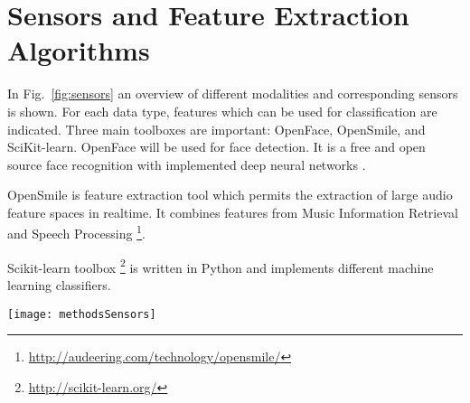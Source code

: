 \begin{comment}
\textbf{Project Oxford:} by Microsoft provides APIs for categories such as Vision, Speech, Language, Knowledge and Search. Can be tested for free.
\url{https://azure.microsoft.com/en-us/try/cognitive-services/}\\

\textbf{FaceReader:} by Noldus is widely used for academic purposes. It is a facial expression analysis software for analyzing universal emotions in addition to neutral and contempt. The software is also used to observe gaze direction and head orientation. Used more than 10,000 annotated images for training. Describes the face with 500 key points. Can be rented. 
\url{http://www.noldus.com/human-behavior-research/products/facereader}\\

\textbf{InSight} by Sightcorp is a facial expression analysis API and is also used for eye tracking, age and gender estimation, head pose estimation, etc. 2 weeks free trial.
\url{http://sightcorp.com/insight/}\\
\end{comment}




\section{Sensors and Feature Extraction Algorithms}
\label{sec:sensorsFeatures}

In Fig.~\ref{fig:sensors} an overview of different modalities and corresponding sensors is shown. For each data type, features which can be used for classification are indicated. Three main toolboxes are important: OpenFace, OpenSmile, and SciKit-learn.
OpenFace will be used for face detection. It is a free and open source face recognition with implemented deep neural networks \cite{Amos2016openface}.

OpenSmile is feature extraction tool which permits the extraction of large audio feature spaces in realtime. It combines features from Music Information Retrieval and Speech Processing \footnote{\url{http://audeering.com/technology/opensmile/}}.

Scikit-learn toolbox \footnote{\url{http://scikit-learn.org/}} is written in Python and implements different machine learning classifiers.

\begin{sidewaysfigure}
\centering
\texttt{[image: methodsSensors]}
\caption{Overview of possible sensors to use and of the feature extraction algorithms. * indicates sensors available at the lab.}
\label{fig:sensors}
\end{sidewaysfigure}




